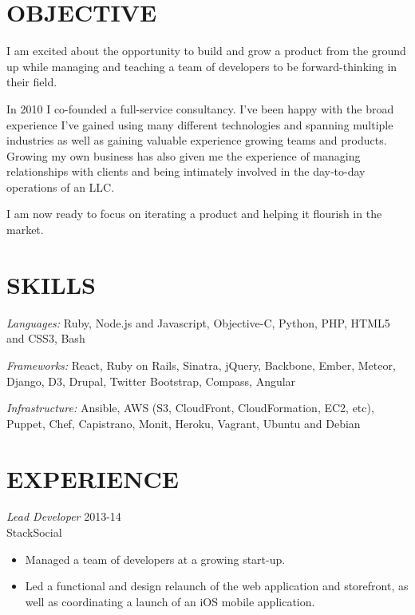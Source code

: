 \documentclass[line,margin]{res}
\begin{document}
\address{q.shanahan@gmail.com}
\address{(641) 233-1123}

\begin{resume}

\section{OBJECTIVE}

    I am excited about the opportunity to build and grow a product from the
    ground up while managing and teaching a team of developers to be
    forward-thinking in their field.

    In 2010 I co-founded a full-service consultancy. I've been happy with the
    broad experience I've gained using many different technologies and
    spanning multiple industries as well as gaining valuable experience
    growing teams and products. Growing my own business has also given me the
    experience of managing relationships with clients and being intimately
    involved in the day-to-day operations of an LLC.

    I am now ready to focus on iterating a product and helping it flourish in
    the market.

\section{SKILLS}
    {\sl Languages:}
        Ruby, Node.js and Javascript,
        Objective-C, Python, PHP, HTML5 and CSS3, Bash

    {\sl Frameworks:}
        React, Ruby on Rails, Sinatra, jQuery, Backbone, Ember,
        Meteor, Django, D3, Drupal, Twitter Bootstrap, Compass,
        Angular

    {\sl Infrastructure:}
        Ansible, AWS (S3, CloudFront, CloudFormation, EC2, etc), Puppet,
        Chef, Capistrano, Monit, Heroku, Vagrant, Ubuntu and Debian

\section{EXPERIENCE}
    {\sl Lead Developer}
    \hfill 2013-14 \\
    StackSocial
    \begin{itemize} \itemsep -2pt
        \item
            Managed a team of developers at a growing start-up.

        \item
            Led a functional and design relaunch of the web
            application and storefront, as well as coordinating
            a launch of an iOS mobile application.
    \end{itemize}


\end{resume}
\end{document}
